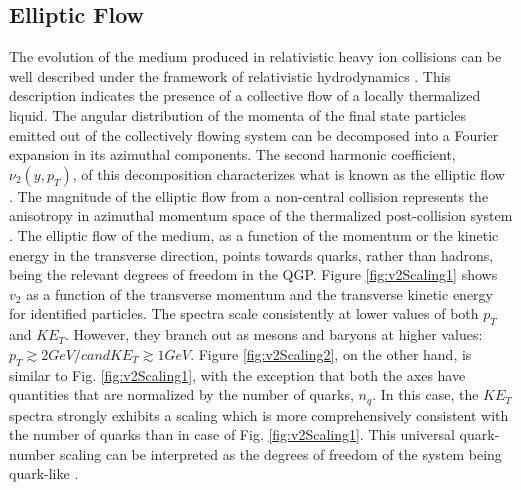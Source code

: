 \subsection{Elliptic Flow}
The evolution of the medium produced in relativistic heavy ion collisions can be well described under the framework of relativistic hydrodynamics \cite{SCHENKE2017105,2014NuPhA.926...92S}. This description indicates the presence of a collective flow of a locally thermalized liquid. The angular distribution of the momenta of the final state particles emitted out of the collectively flowing system can be decomposed into a Fourier expansion in its azimuthal components. The second harmonic coefficient, $\nu_{2}(y,p_{T})$, of this decomposition characterizes what is known as the elliptic flow \cite{2001PhLB..503...58H}. The magnitude of the elliptic flow from a non-central collision represents the anisotropy in azimuthal momentum space of the thermalized post-collision system \cite{2011NJPh...13e5008S}.
The elliptic flow of the medium, as a function of the momentum or the kinetic energy in the transverse direction, points towards quarks, rather than hadrons, being the relevant degrees of freedom in the QGP. Figure \ref{fig:v2Scaling1} shows $v_{2}$ as a function of the transverse momentum and the transverse kinetic energy for identified particles. The spectra scale consistently at lower values of both $p_{T}$ and $KE_{T}$. However, they branch out as mesons and baryons at higher values: $p_{T} \gtrsim 2 GeV/c and KE_{T} \gtrsim 1 GeV$. Figure \ref{fig:v2Scaling2}, on the other hand, is similar to Fig. \ref{fig:v2Scaling1}, with the exception that both the axes have quantities that are normalized by the number of quarks, $n_{q}$. In this case, the $KE_{T}$ spectra strongly exhibits a scaling which is more comprehensively consistent with the number of quarks than in case of Fig. \ref{fig:v2Scaling1}. This universal quark-number scaling can be interpreted as the degrees of freedom of the system being quark-like \cite{2007PhRvL..98p2301A}.
